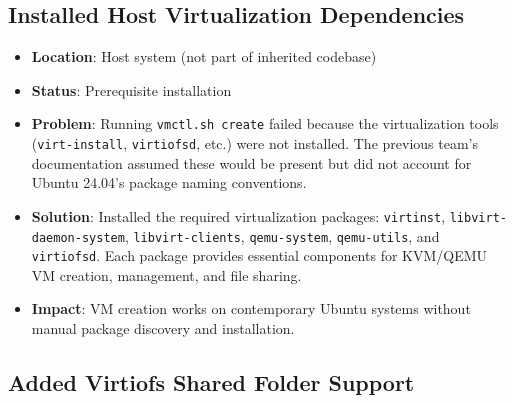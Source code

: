 \subsection{Installed Host Virtualization Dependencies}

\begin{itemize}
\item \textbf{Location}: Host system (not part of inherited codebase)

\item \textbf{Status}: Prerequisite installation

\item \textbf{Problem}: Running \texttt{vmctl.sh create} failed because the virtualization tools (\texttt{virt-install}, \texttt{virtiofsd}, etc.) were not installed. The previous team's documentation assumed these would be present but did not account for Ubuntu 24.04's package naming conventions.

\item \textbf{Solution}: Installed the required virtualization packages: \texttt{virtinst}, \texttt{libvirt-daemon-system}, \texttt{libvirt-clients}, \texttt{qemu-system}, \texttt{qemu-utils}, and \texttt{virtiofsd}. Each package provides essential components for KVM/QEMU VM creation, management, and file sharing.

\item \textbf{Impact}: VM creation works on contemporary Ubuntu systems without manual package discovery and installation.
\end{itemize}

\subsection{Added Virtiofs Shared Folder Support}

